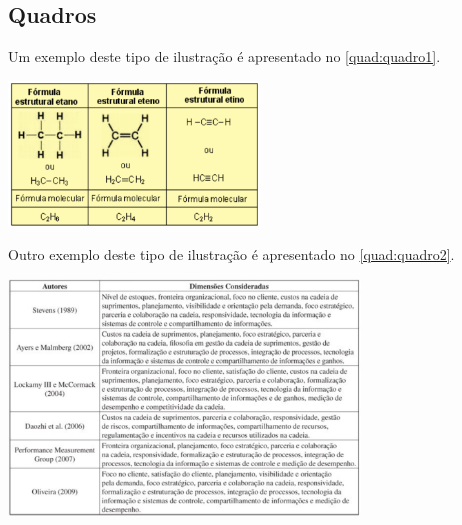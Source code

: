 \subsection{Quadros}\label{sec:quadros}

Um exemplo deste tipo de ilustra\c{c}\~ao \'e apresentado no \autoref{quad:quadro1}.

\begin{tabframed}[Htb]%
\captionsetup{width=0.5\textwidth}%
\caption{Compostos org\^anicos: f\'ormulas estruturais e principais classes.}%
\label{quad:quadro1}%
\includegraphics[width=0.5\textwidth]{./CapituloExemplo/quadro1}%
\end{tabframed}

Outro exemplo deste tipo de ilustra\c{c}\~ao \'e apresentado no \autoref{quad:quadro2}.

\begin{tabframed}[Htb]%
\captionsetup{width=0.7\textwidth}%
\caption{Modelos de maturidade para a gest\~ao da cadeia de suprimentos.}%
\label{quad:quadro2}%
\includegraphics[width=0.7\textwidth]{./CapituloExemplo/quadro2}%
\end{tabframed}

